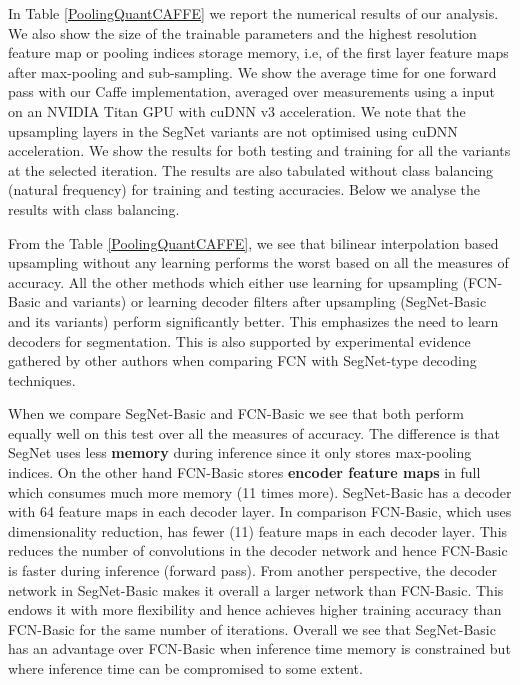 \documentclass[10pt,journal,compsoc]{IEEEtran}
\begin{document}
In Table \ref{PoolingQuantCAFFE} we report the numerical results of our analysis. We also show the size of the trainable parameters and the highest resolution feature map or pooling indices storage memory, i.e, of the first layer feature maps after max-pooling and sub-sampling. We show the average time for one forward pass with our Caffe implementation, averaged over  measurements using a  input on an NVIDIA Titan GPU with cuDNN v3 acceleration. We note that the upsampling layers in the SegNet variants are not optimised using cuDNN acceleration. We show the results for both testing and training for all the variants at the selected iteration. The results are also tabulated without class balancing (natural frequency) for training and testing accuracies. Below we analyse the results with class balancing.

From the Table \ref{PoolingQuantCAFFE}, we see that bilinear interpolation based upsampling without any learning performs the worst based on all the measures of accuracy. All the other methods which either use learning for upsampling (FCN-Basic and variants) or learning decoder filters after upsampling (SegNet-Basic and its variants) perform significantly better. This emphasizes the need to learn decoders for segmentation. This is also supported by experimental evidence gathered by other authors when comparing FCN with SegNet-type decoding techniques\cite{noh2015learning}.

When we compare SegNet-Basic and FCN-Basic we see that both perform equally well on this test over all the measures of accuracy. The difference is that SegNet uses less \textbf{memory} during inference since it only stores max-pooling indices. On the other hand FCN-Basic stores \textbf{encoder feature maps} in full which consumes much more memory (11 times more). SegNet-Basic has a decoder with 64 feature maps in each decoder layer. In comparison FCN-Basic, which uses dimensionality reduction, has fewer (11) feature maps in each decoder layer. This reduces the number of convolutions in the decoder network and hence FCN-Basic is faster during inference (forward pass). From another perspective, the decoder network in SegNet-Basic makes it overall a larger network than FCN-Basic. This endows it with more flexibility and hence achieves higher training accuracy than FCN-Basic for the same number of iterations. Overall we see that SegNet-Basic has an advantage over FCN-Basic when inference time memory is constrained but where inference time can be compromised to some extent. 
\end{document}
